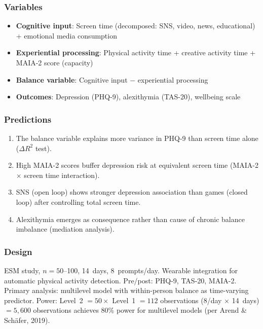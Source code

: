 \documentclass[a4paper,11pt,titlepage]{article}
\begin{document}
\subsubsection{Variables}
\begin{itemize}
  \item \textbf{Cognitive input}: Screen time (decomposed: SNS, video, news, educational) + emotional media consumption
  \item \textbf{Experiential processing}: Physical activity time + creative activity time + MAIA-2 score (capacity)
  \item \textbf{Balance variable}: Cognitive input $-$ experiential processing
  \item \textbf{Outcomes}: Depression (PHQ-9), alexithymia (TAS-20), wellbeing scale
\end{itemize}

\subsubsection{Predictions}
\begin{enumerate}
  \item The balance variable explains more variance in PHQ-9 than screen time alone ($\Delta R^2$ test).
  \item High MAIA-2 scores buffer depression risk at equivalent screen time (MAIA-2 $\times$ screen time interaction).
  \item SNS (open loop) shows stronger depression association than games (closed loop) after controlling total screen time.
  \item Alexithymia emerges as consequence rather than cause of chronic balance imbalance (mediation analysis).
\end{enumerate}

\subsubsection{Design}
ESM study, $n = 50$--100, 14~days, 8~prompts/day. Wearable integration for automatic physical activity detection. Pre/post: PHQ-9, TAS-20, MAIA-2. Primary analysis: multilevel model with within-person balance as time-varying predictor. Power: Level~2 $= 50 \times$ Level~1 $= 112$ observations (8/day $\times$ 14~days) $= 5{,}600$ observations achieves 80\% power for multilevel models (per Arend \& Sch\"afer, 2019).
\end{document}
